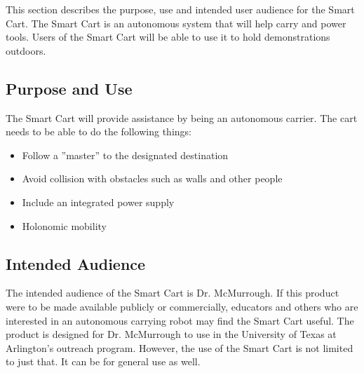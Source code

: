 This section describes the purpose, use and intended user audience for the Smart Cart. The Smart Cart is an autonomous system that will help carry and power tools. Users of the Smart Cart will be able to use it to hold demonstrations outdoors.

\subsection{Purpose and Use}
The Smart Cart will provide assistance by being an autonomous carrier. The cart needs to be able to do the following things:
\begin{itemize}
	\item Follow a ''master'' to the designated destination
	\item Avoid collision with obstacles such as walls and other people
	\item Include an integrated power supply
	\item Holonomic mobility
\end{itemize}


\subsection{Intended Audience}
The intended audience of the Smart Cart is Dr. McMurrough. If this product were to be made available publicly or commercially, educators and others who are interested in an autonomous carrying robot may find the Smart Cart useful. The product is designed for Dr. McMurrough to use in the University of Texas at Arlington's outreach program. However, the use of the Smart Cart is not limited to just that. It can be for general use as well.
